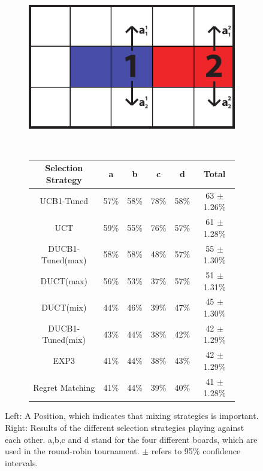\documentclass{article}
\begin{document}
\begin{figure}[t]
\centering
\begin{subfigure}[c]{0.3\textwidth}
\includegraphics[width=\textwidth]{images/stochastic.pdf}
\end{subfigure}
~~~
\begin{subfigure}[c]{0.5\textwidth}
\scriptsize
\centering
\begin{tabular}{|c||c|c|c|c|c|}
									\hline
	Selection Strategy	& a 		  & b 		  & c 		  & d 		  & Total 	\\ \hline
	UCB1-Tuned		      & 57\%	  & 58\%		& 78\%		& 58\%		& 63 $\pm$ 1.26\%		\\ \hline
	UCT			            & 59\%		& 55\%		& 76\%		& 57\%		& 61 $\pm$ 1.28\%		\\ \hline
	DUCB1-Tuned(max)	  & 58\%		& 58\%		& 48\%		& 57\%		& 55 $\pm$ 1.30\%		\\ \hline
	DUCT(max)		        & 56\%		& 53\%		& 37\%		& 57\%		& 51 $\pm$ 1.31\%		\\ \hline
	DUCT(mix)		        & 44\%		& 46\%		& 39\%		& 47\%		& 45 $\pm$ 1.30\%		\\ \hline
	DUCB1-Tuned(mix)	  & 43\%		& 44\%		& 38\%		& 42\%		& 42 $\pm$ 1.29\%		\\ \hline
	EXP3			          & 41\%		& 44\%		& 38\%		& 43\%		& 42 $\pm$ 1.29\%		\\ \hline
	Regret Matching		  & 41\%		& 44\%		& 39\%		& 40\%		& 41 $\pm$ 1.28\%		\\ \hline
\end{tabular}
\end{subfigure}
\caption{Left: A Position, which indicates that mixing strategies is important. Right: Results of the different selection strategies playing against each other. a,b,c and d stand for the four different boards, which are used in the round-robin tournament. $\pm$ refers to 95\% confidence intervals.}
\label{fig:example_avgs}
\end{figure}
\end{document}
